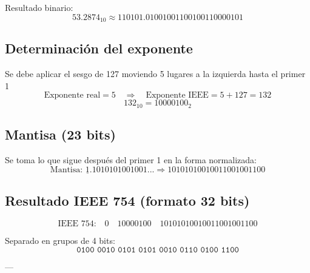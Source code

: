 \documentclass[a4paper,12pt]{article}
\begin{document}
\begin{center}
		Resultado binario: 
		\[
		53.2874_{10} \approx 110101.01001001100100110000101
		\]
		
		\subsection*{Determinación del exponente}
		
		Se debe aplicar el sesgo de 127 moviendo 5 lugares a la izquierda hasta el primer 1
		\vspace{-0.5em}
		\[
		\text{Exponente real} = 5 \quad \Rightarrow \quad \text{Exponente IEEE} = 5 + 127 = 132
		\]
		\vspace{-0.5em}
		\[
		132_{10} = 10000100_2
		\]
		
		\subsection*{Mantisa (23 bits)}
		
		Se toma lo que sigue después del primer 1 en la forma normalizada:
		\vspace{-0.5em}
		\[
		\text{Mantisa: } \underline{1}.1010101001001... \Rightarrow 10101010010011001001100
		\]
		
		\subsection*{Resultado IEEE 754 (formato 32 bits)}
		
		\[
		\text{IEEE 754:} \quad 
		\boxed{0} \quad \boxed{10000100} \quad \boxed{10101010010011001001100}
		\]
		
		Separado en grupos de 4 bits:
		\vspace{-0.5em}
		\[
		\texttt{0100\ 0010\ 0101\ 0101\ 0010\ 0110\ 0100\ 1100}
		\]
		
		---	
	\end{center}
		\vspace{6cm}
\end{document}
